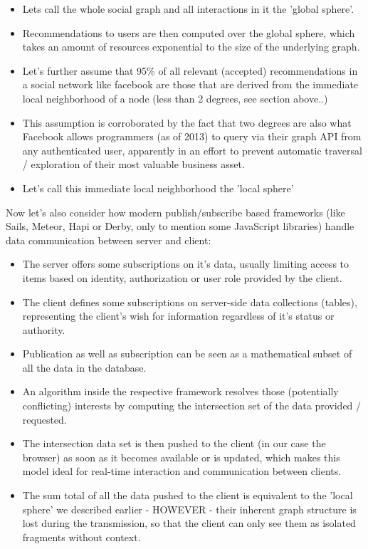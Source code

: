 		\begin{itemize}
			\item Lets call the whole social graph and all interactions in it the 'global sphere'.
			\item Recommendations to users are then computed over the global sphere, which takes an amount of resources exponential to the size of the underlying graph.
			\item Let's further assume that 95\% of all relevant (accepted) recommendations in a social network like facebook are those that are derived from the immediate local neighborhood of a node (less than 2 degrees, see section above..)
			\item This assumption is corroborated by the fact that two degrees are also what Facebook allows programmers (as of 2013) to query via their graph API from any authenticated user, apparently in an effort to prevent automatic traversal / exploration of their most valuable business asset.
			\item Let's call this immediate local neighborhood the 'local sphere'
		\end{itemize}
			
		Now let's also consider how modern publish/subscribe based frameworks (like Sails, Meteor, Hapi or Derby, only to mention some JavaScript libraries) handle data communication between server and client:
		
		\begin{itemize}
			\item The server offers some subscriptions on it's data, usually limiting access to items based on identity, authorization or user role provided by the client.
			\item The client defines some subscriptions on server-side data collections (tables), representing the client's wish for information regardless of it's status or authority.
			\item Publication as well as subscription can be seen as a mathematical subset of all the data in the database.
			\item An algorithm inside the respective framework resolves those (potentially conflicting) interests by computing the intersection set of the data provided / requested.
			\item The intersection data set is then pushed to the client (in our case the browser) as soon as it becomes available or is updated, which makes this model ideal for real-time interaction and communication between clients.
			\item The sum total of all the data pushed to the client is equivalent to the 'local sphere' we described earlier - HOWEVER - their inherent graph structure is lost during the transmission, so that the client can only see them as isolated fragments without context.
		\end{itemize}
		
